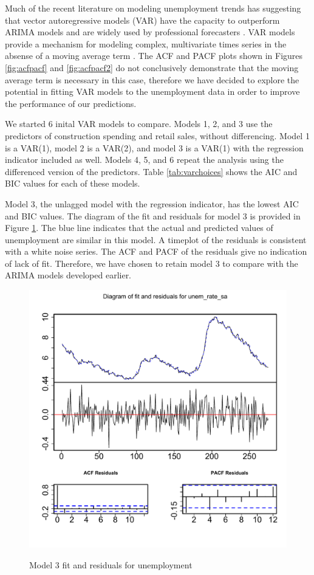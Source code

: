 \documentclass[twoside,twocolumn]{article}
\begin{document}
      
     Much of the recent literature on modeling unemployment trends has suggesting that vector autoregressive models (VAR) have the capacity to outperform ARIMA models and are widely used by professional forecasters \citep{Meyer2015, Tasci2015, Barnichon2016}. VAR models provide a mechanism for modeling complex, multivariate times series in the absense of a moving average term \citep{Chatfield2001} . The ACF and PACF plots shown in Figures \ref{fig:acfpacf} and \ref{fig:acfpacf2} do not conclusively demonstrate that the moving average term is necessary in this case, therefore we have decided to explore the potential in fitting VAR models to the unemployment data in order to improve the performance of our predictions.  

We started 6 inital VAR models to compare. Models 1, 2, and 3 use the predictors of construction spending and retail sales, without differencing. Model 1 is a VAR(1), model 2 is a VAR(2), and model 3 is a VAR(1) with the regression indicator included as well. Models 4, 5, and 6 repeat the analysis using the differenced version of the predictors. Table \ref{tab:varchoices} shows the AIC and BIC values for each of these models.  

Model 3, the unlagged model with the regression indicator, has the lowest AIC and BIC values.  The diagram of the fit and residuals for model 3 is provided in Figure \ref{fig:varfitmodel3}. The blue line indicates that the actual and predicted values of unemployment are similar in this model. A timeplot of the residuals is consistent with a white noise series. The ACF and PACF of the residuals give no indication of lack of fit. Therefore, we have chosen to retain model 3 to compare with the ARIMA models developed earlier. 


   \begin{figure}[htb]
    	\centering
     	\caption{Model 3 fit and residuals for unemployment}
     	\includegraphics[width=\linewidth]{images/varfitmodel3}
     	\label{fig:varfitmodel3}
 \end{figure}
 
\end{document}
